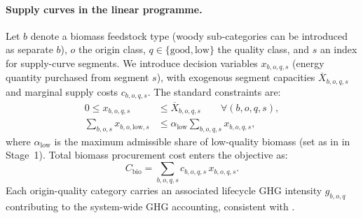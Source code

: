 \documentclass{article}
\begin{document}
\paragraph{Supply curves in the linear programme.}
Let $b$ denote a biomass feedstock type (woody sub-categories can be introduced as separate $b$), $o$ the origin class, $q \in \{\text{good},\text{low}\}$ the quality class, and $s$ an index for supply-curve segments.
We introduce decision variables $x_{b,o,q,s}$ (energy quantity purchased from segment $s$), with exogenous segment capacities $\overline{X}_{b,o,q,s}$ and marginal supply costs $c_{b,o,q,s}$.
The standard constraints are:
\begin{align}
0 \leq x_{b,o,q,s} &\leq \overline{X}_{b,o,q,s} \qquad \forall (b,o,q,s),
\label{eq:bio_segment_cap}\\
\sum_{b,o,s} x_{b,o,\text{low},s} &\leq \alpha_{\text{low}} \sum_{b,o,q,s} x_{b,o,q,s},
\label{eq:bio_quality_share}
\end{align}
where $\alpha_{\text{low}}$ is the maximum admissible share of low-quality biomass (set as in \citet{colla_optimal_2022} in Stage~1).
Total biomass procurement cost enters the objective as:
\begin{equation}
C_{\text{bio}}=\sum_{b,o,q,s} c_{b,o,q,s}\,x_{b,o,q,s}.
\label{eq:bio_cost}
\end{equation}
Each origin-quality category carries an associated lifecycle GHG intensity $g_{b,o,q}$ contributing to the system-wide GHG accounting, consistent with \citet{colla_optimal_2022}.

\end{document}
